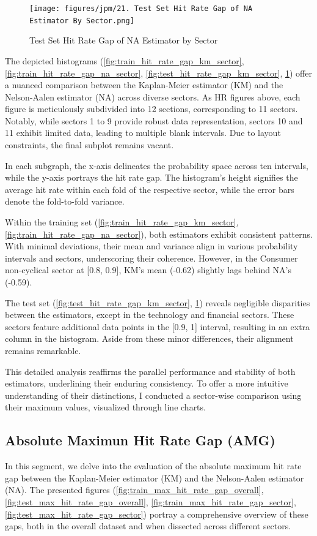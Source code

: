 \begin{figure}[H]
    \centering
    \texttt{[image: figures/jpm/21. Test Set Hit Rate Gap of NA Estimator By Sector.png]}
    \caption{Test Set Hit Rate Gap of NA Estimator by Sector}
    \label{fig:test_hit_rate_gap_na_sector}
\end{figure}

The depicted histograms (\ref{fig:train_hit_rate_gap_km_sector}, \ref{fig:train_hit_rate_gap_na_sector}, \ref{fig:test_hit_rate_gap_km_sector}, \ref{fig:test_hit_rate_gap_na_sector}) offer a nuanced comparison between the Kaplan-Meier estimator (KM) and the Nelson-Aalen estimator (NA) across diverse sectors. As HR figures above, each figure is meticulously subdivided into 12 sections, corresponding to 11 sectors. Notably, while sectors 1 to 9 provide robust data representation, sectors 10 and 11 exhibit limited data, leading to multiple blank intervals. Due to layout constraints, the final subplot remains vacant.

In each subgraph, the x-axis delineates the probability space across ten intervals, while the y-axis portrays the hit rate gap. The histogram's height signifies the average hit rate within each fold of the respective sector, while the error bars denote the fold-to-fold variance.

Within the training set (\ref{fig:train_hit_rate_gap_km_sector}, \ref{fig:train_hit_rate_gap_na_sector}), both estimators exhibit consistent patterns. With minimal deviations, their mean and variance align in various probability intervals and sectors, underscoring their coherence. However, in the Consumer non-cyclical sector at [0.8, 0.9], KM's mean (-0.62) slightly lags behind NA's (-0.59).

The test set (\ref{fig:test_hit_rate_gap_km_sector}, \ref{fig:test_hit_rate_gap_na_sector}) reveals negligible disparities between the estimators, except in the technology and financial sectors. These sectors feature additional data points in the [0.9, 1] interval, resulting in an extra column in the histogram. Aside from these minor differences, their alignment remains remarkable.

This detailed analysis reaffirms the parallel performance and stability of both estimators, underlining their enduring consistency. To offer a more intuitive understanding of their distinctions, I conducted a sector-wise comparison using their maximum values, visualized through line charts.

\subsection{Absolute Maximun Hit Rate Gap (AMG)}
In this segment, we delve into the evaluation of the absolute maximum hit rate gap between the Kaplan-Meier estimator (KM) and the Nelson-Aalen estimator (NA). The presented figures (\ref{fig:train_max_hit_rate_gap_overall}, \ref{fig:test_max_hit_rate_gap_overall}, \ref{fig:train_max_hit_rate_gap_sector}, \ref{fig:test_max_hit_rate_gap_sector}) portray a comprehensive overview of these gaps, both in the overall dataset and when dissected across different sectors.

